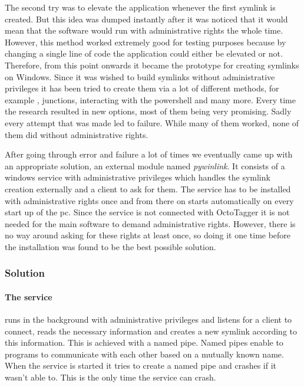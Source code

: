 The second try was to elevate the application whenever the first symlink is created. But this idea was dumped instantly after it was noticed that it would mean that the software would run with administrative rights the whole time. However, this method worked extremely good for testing purposes because by changing a single line of code the application could either be elevated or not. Therefore, from this point onwards it became the prototype for creating symlinks on Windows.
Since it was wished to build symlinks without administrative privileges it has been tried to create them via a lot of different methods, for example , junctions, interacting with the powershell and many more. Every time the research resulted in new options, most of them being very promising. Sadly every attempt that was made led to failure. While many of them worked, none of them did without administrative rights.
 
After going through error and failure a lot of times we eventually came up with an appropriate solution, an external module named \textit{pywinlink}. It consists of a windows service with administrative privileges which handles the symlink creation externally and a client to ask for them. The service has to be installed with administrative rights once and from there on starts automatically on every start up of the pc. Since the service is not connected with OctoTagger it is not needed for the main software to demand administrative rights. However, there is no way around asking for these rights at least once, so doing it one time before the installation was found to be the best possible solution. 

\subsubsection{Solution} %

\paragraph{The service} runs in the background with administrative privileges
and listens for a client to connect, reads the necessary information and
creates a new symlink according to this information. This is achieved with a
named pipe. Named pipes enable to programs to communicate with each other based
on a mutually known name. When the service is started it tries to create a
named pipe and crashes if it wasn't able to. This is the only time the service
can crash.

